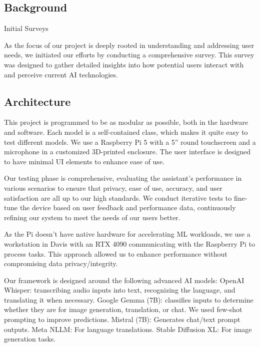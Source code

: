 \documentclass[12pt]{article}
\begin{document}
\subsection{Background}
Initial Surveys

As the focus of our project is deeply rooted in understanding and addressing user needs, we initiated our efforts by conducting a comprehensive survey. This survey was designed to gather detailed insights into how potential users interact with and perceive current AI technologies. 

\subsection{Architecture}

This project is programmed to be as modular as possible, both in the hardware and software. Each model is a self-contained class, which makes it quite easy to test different models. We use a Raspberry Pi 5 with a 5” round touchscreen and a microphone in a customized 3D-printed enclosure. The user interface is designed to have minimal UI elements to enhance ease of use.

Our testing phase is comprehensive, evaluating the assistant's performance in various scenarios to ensure that privacy, ease of use, accuracy, and user satisfaction are all up to our high standards. We conduct iterative tests to fine-tune the device based on user feedback and performance data, continuously refining our system to meet the needs of our users better. 

As the Pi doesn't have native hardware for accelerating ML workloads, we use a workstation in Davis with an RTX 4090 communicating with the Raspberry Pi to process tasks. This approach allowed us to  enhance performance without compromising data privacy/integrity. 

Our framework is designed around the following advanced AI models:
OpenAI Whisper: transcribing audio inputs into text, recognizing the language, and translating it when necessary.
Google Gemma (7B): classifies inputs to determine whether they are for image generation, translation, or chat. We used few-shot prompting to improve predictions. 
Mistral (7B): Generates chat/text prompt outputs. 
Meta NLLM: For language translations.
Stable Diffusion XL: For image generation tasks.
\end{document}
